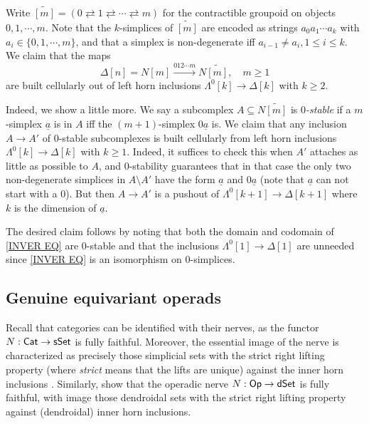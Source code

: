 \documentclass[a4paper,10pt
,draft
]{article}%
\begin{document}
\begin{remark}\label{CONTGR REM}
Write 
$\widetilde{[m]} = 
(0 \rightleftarrows 1 
\rightleftarrows \cdots 
\rightleftarrows m)$
for the contractible groupoid on objects $0,1,\cdots,m$. Note that the $k$-simplices of $\widetilde{[m]}$
are encoded as strings $a_0 a_1 \cdots a_k$
with $a_{i} \in \{0,1,\cdots,m\}$, and that a simplex is non-degenerate iff $a_{i-1}\not = a_{i}, 1 \leq i \leq k$.
We claim that the maps
\begin{equation}\label{INVER EQ}
	\Delta[n] = N [m] \xrightarrow{012\cdots m} N \widetilde{[m]},\quad m \geq 1
\end{equation}
are built cellularly out of left horn inclusions $\Lambda^{0}[k] \to \Delta[k]$ with $k\geq 2$.

Indeed, we show a little more. We say a subcomplex 
$A \subseteq N \widetilde{[m]}$ is \textit{$0$-stable}
if a $m$-simplex $\underline{a}$ is in $A$ iff the $(m+1)$-simplex $0\underline{a}$ is.
We claim that any inclusion $A \to A'$ of $0$-stable subcomplexes is built cellularly from left horn inclusions $\Lambda^{0}[k] \to \Delta[k]$ with $k\geq 1$.
Indeed, it suffices to check this when $A'$ attaches as little as 
possible to $A$, and $0$-stability guarantees that in that case the only two non-degenerate simplices in $A \setminus A'$
have the form 
$\underline{a}$ and $0\underline{a}$
(note that $\underline{a}$ can not start with a $0$).
But then $A\to A'$ is a pushout of 
$\Lambda^{0}[k+1] \to \Delta[k+1]$ where $k$ is the dimension of $\underline{a}$.

The desired claim follows by noting that both the domain and codomain of \eqref{INVER EQ} are $0$-stable and that the  inclusions 
$\Lambda^0[1] \to \Delta[1]$ are unneeded since \eqref{INVER EQ} is an isomorphism on $0$-simplices.
\end{remark}






\subsection{Genuine equivariant operads}\label{GENEQOP SEC}



Recall that categories can be identified with their nerves, as the functor $N: \mathsf{Cat} \to \mathsf{sSet}$ is fully faithful.
Moreover, the essential image of the nerve is characterized as precisely those simplicial sets
with the strict right lifting property 
(where \textit{strict} means that the lifts are unique)
against the inner horn inclusions \cite[Prop. 1.1.2.2]{Lur09}.
Similarly, \cite[Prop. 5.3 and Thm. 6.1]{MW09} show that the operadic nerve $N: \mathsf{Op} \to \mathsf{dSet}$ is fully faithful,
with image those dendroidal sets with the strict right lifting property against (dendroidal) inner horn inclusions.
\end{document}
